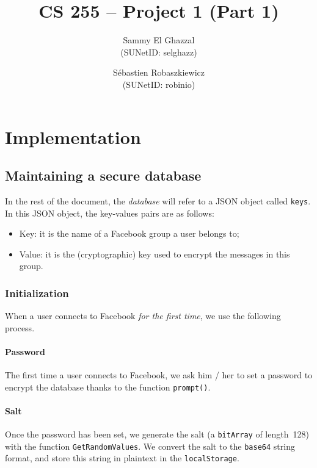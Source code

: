 \documentclass[10pt,twocolumn]{article}
\title{
  CS 255 -- Project 1 (Part 1) }
\author{
  Sammy El Ghazzal\\
  (SUNetID: selghazz)
  \and
  S\'ebastien Robaszkiewicz\\
  (SUNetID: robinio)
}
\date{}
\begin{document}
  \maketitle




\section{Implementation}


\subsection{Maintaining a secure database}

In the rest of the document, the \textit{database} will refer to a JSON object called \texttt{keys}. In this JSON object, the key-values pairs are as follows:
\begin{itemize}
  \item Key: it is the name of a Facebook group a user belongs to;
  \item Value: it is the (cryptographic) key used to encrypt the messages in this group.
\end{itemize}

\subsubsection{Initialization}

When a user connects to Facebook \textit{for the first time}, we use the following process.

\paragraph{Password}
The first time a user connects to Facebook, we ask him / her to set a password to encrypt the database thanks to the function \texttt{prompt()}.

\paragraph{Salt}\label{salt}
Once the password has been set, we generate the salt (a \texttt{bitArray} of length~128) with the function \texttt{GetRandomValues}. We convert the salt to the \texttt{base64} string format, and store this string in plaintext in the \texttt{localStorage}.
\end{document}
